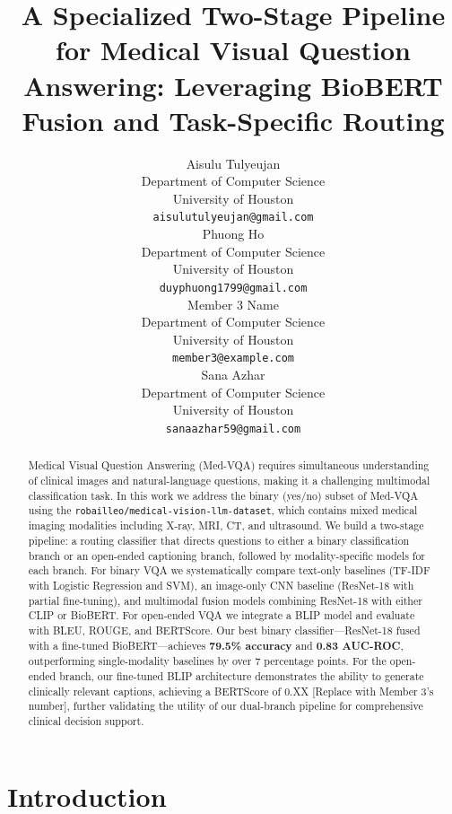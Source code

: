 \documentclass{article}
\title{A Specialized Two-Stage Pipeline for Medical Visual Question Answering: Leveraging BioBERT Fusion and Task-Specific Routing}
\author{%
  Aisulu Tulyeujan \\
  Department of Computer Science \\
  University of Houston \\
  \texttt{aisulutulyeujan@gmail.com} \\
  \And
  Phuong Ho \\
  Department of Computer Science \\
  University of Houston \\
  \texttt{duyphuong1799@gmail.com} \\
  \And
  Member 3 Name \\
  Department of Computer Science \\
  University of Houston \\
  \texttt{member3@example.com} \\
  \And
  Sana Azhar \\
  Department of Computer Science \\
  University of Houston \\
  \texttt{sanaazhar59@gmail.com} \\
}
\begin{document}
\maketitle

\begin{abstract}
Medical Visual Question Answering (Med-VQA) requires simultaneous understanding
of clinical images and natural-language questions, making it a challenging
multimodal classification task. In this work we address the binary (yes/no)
subset of Med-VQA using the \texttt{robailleo/medical-vision-llm-dataset}, which
contains mixed medical imaging modalities including X-ray, MRI, CT, and
ultrasound. We build a two-stage pipeline: a routing classifier that directs
questions to either a binary classification branch or an open-ended captioning
branch, followed by modality-specific models for each branch. For binary VQA we
systematically compare text-only baselines (TF-IDF with Logistic Regression and
SVM), an image-only CNN baseline (ResNet-18 with partial fine-tuning), and
multimodal fusion models combining ResNet-18 with either CLIP or BioBERT. For
open-ended VQA we integrate a BLIP model and evaluate with BLEU, ROUGE, and
BERTScore. Our best binary classifier---ResNet-18 fused with a fine-tuned
BioBERT---achieves \textbf{79.5\% accuracy} and \textbf{0.83 AUC-ROC},
outperforming single-modality baselines by over 7 percentage points. For the 
open-ended branch, our fine-tuned BLIP architecture demonstrates the ability 
to generate clinically relevant captions, achieving a BERTScore of 0.XX 
[Replace with Member 3's number], further validating the utility of our 
dual-branch pipeline for comprehensive clinical decision support.
\end{abstract}


\section{Introduction}
\end{document}
